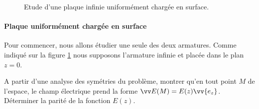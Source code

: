 \documentclass[11pt,fleqn]{book} %
\begin{document}
\begin{figure}[htbp]
\centering


\caption{Etude d'une plaque infinie uniformément chargée en surface.}
\label{fig:surface}
\end{figure}

\paragraph{Plaque uniformément chargée en surface}

Pour commencer, nous allons étudier une seule des deux armatures. Comme indiqué sur la figure \ref{fig:surface} nous supposons l'armature infinie et placée dans le plan $z=0$.

\begin{capex}
A partir d'une analyse des symétries du problème, montrer qu'en tout point $M$ de l'espace, le champ électrique prend la forme $\vv E(M) = E(z) \vv{e_z}$. Déterminer la parité de la fonction $E(z)$.
\end{capex}

\end{document}
